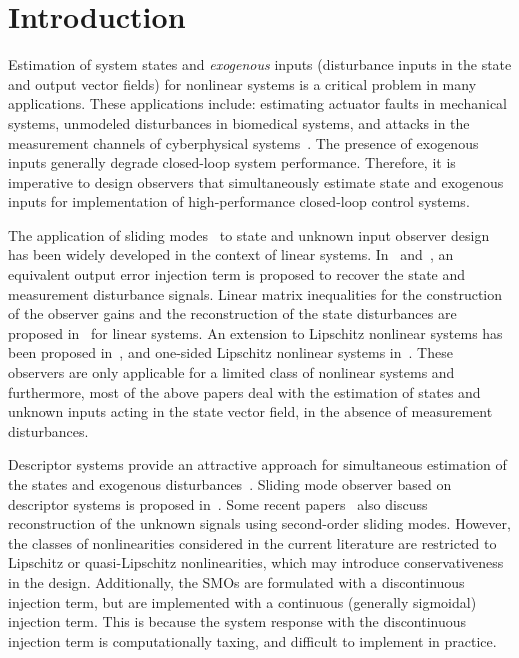 \documentclass[times, doublespace]{rncauth}
\begin{document}
\section{Introduction}\label{sec:intro}
Estimation of system states and \textit{exogenous} inputs (disturbance inputs in the state and output vector fields) for nonlinear systems is a critical problem in many applications. These applications include: estimating actuator faults in mechanical systems, unmodeled disturbances in biomedical systems, and attacks in the measurement channels of cyberphysical systems~\cite{Chen1999, Chakrabarty2014, Pasqualetti2013}. The presence of exogenous inputs generally degrade closed-loop system performance. Therefore, it is imperative to design observers that simultaneously estimate state and exogenous inputs for implementation of high-performance closed-loop control systems.

The application of sliding modes~\cite{Utkin1977, DeCarlo1988, Kachroo1996, Rundell1998, DeCarlo2000, Utkin2009} to state and unknown input observer design has been widely developed in the context of linear systems. In~\cite{Edwards2000} and~\cite{Tan2002}, an equivalent output error injection term is proposed to recover the state and measurement disturbance signals. Linear matrix inequalities for the construction of the observer gains and the reconstruction of the state disturbances are proposed in~\cite{zak05, Kalsi2010, Kalsi2011,Witczak2015} for linear systems. An extension to Lipschitz nonlinear systems has been proposed in~\cite{Tan2003, Ha2004, Yan2007, Raoufi2010, Raoufi2010b, Teh2013, Veluvolu2011, Veluvolu2014}, and one-sided Lipschitz nonlinear systems in~\cite{Li2014}. These observers are only applicable for a limited class of nonlinear systems and furthermore, most of the above papers deal with the estimation of states and unknown inputs acting in the state vector field, in the absence of measurement disturbances.

Descriptor systems provide an attractive approach for simultaneous estimation of the states and exogenous disturbances~\cite{Darouach1995, Hou1999}. Sliding mode observer based on descriptor systems is proposed in~\cite{Gao2006}. Some recent papers~\cite{Zhu2012, Zhu2014} also discuss reconstruction of the unknown signals using second-order sliding modes. However, the classes of nonlinearities considered in the current literature are restricted to Lipschitz or quasi-Lipschitz nonlinearities, which may introduce conservativeness in the design. Additionally, the SMOs are formulated with a discontinuous injection term, but are implemented with a continuous (generally sigmoidal) injection term. This is because the system response with the discontinuous injection term is computationally taxing, and difficult to implement in practice.
\end{document}
